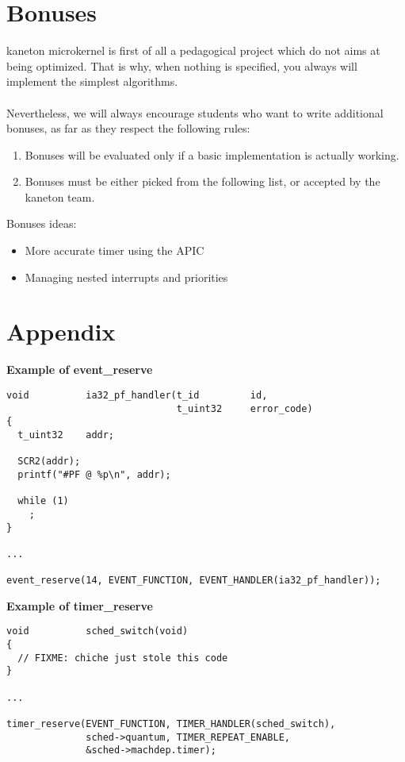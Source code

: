 \newpage

\section{Bonuses}

kaneton microkernel is first of all a pedagogical project which do not
aims at being optimized. That is why, when nothing is specified, you
always will implement the simplest algorithms.\\
\\
Nevertheless, we will always encourage students who want to write
additional bonuses, as far as they respect the following rules:

\begin{enumerate}
  \item Bonuses will be evaluated only if a basic implementation is
  actually working.
  \item Bonuses must be either picked from the following list, or
  accepted by the kaneton team.\\
\end{enumerate}

Bonuses ideas:
\begin{itemize}
\item More accurate timer using the APIC
\item Managing nested interrupts and priorities
\end{itemize}

%
%

\newpage

\section{Appendix}

\textbf{Example of event\_reserve}

\begin{verbatim}
void          ia32_pf_handler(t_id         id,
                              t_uint32     error_code)
{
  t_uint32    addr;

  SCR2(addr);
  printf("#PF @ %p\n", addr);

  while (1)
    ;
}

...

event_reserve(14, EVENT_FUNCTION, EVENT_HANDLER(ia32_pf_handler));
\end{verbatim}

\textbf{Example of timer\_reserve}

\begin{verbatim}
void          sched_switch(void)
{
  // FIXME: chiche just stole this code
}

...

timer_reserve(EVENT_FUNCTION, TIMER_HANDLER(sched_switch),
              sched->quantum, TIMER_REPEAT_ENABLE,
              &sched->machdep.timer);
\end{verbatim}
